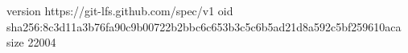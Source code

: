version https://git-lfs.github.com/spec/v1
oid sha256:8c3d11a3b76fa90c9b00722b2bbc6c653b3c5c6b5ad21d8a592c5bf259610aca
size 22004
